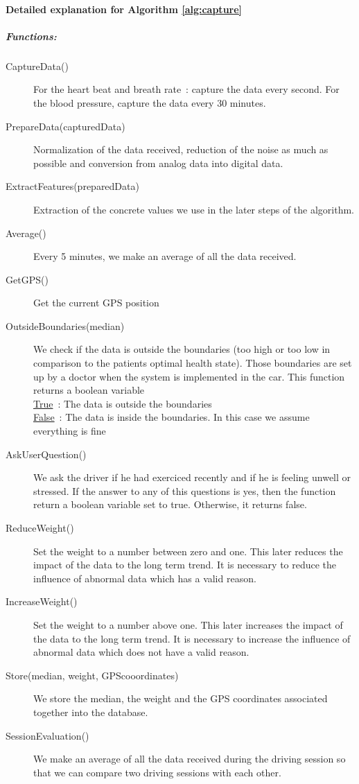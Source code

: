 \paragraph{Detailed explanation for Algorithm \ref{alg:capture}}
\subparagraph{Functions:}
\begin{description}
	\item [CaptureData()] For the heart beat and breath rate : capture the data every second. For the blood pressure, capture the data every 30 minutes.
	\item [PrepareData(capturedData)] Normalization of the data received, reduction of the noise as much as possible and conversion from analog data into digital data.
	\item [ExtractFeatures(preparedData)] Extraction of the concrete values we use in the later steps of the algorithm.
	\item [Average()] Every 5 minutes, we make an average of all the data received.
	\item [GetGPS()] Get the current GPS position
	\item [OutsideBoundaries(median)] We check if the data is outside the boundaries (too high or too low in comparison to the patients optimal health state). Those boundaries are set up by a doctor when the system is implemented in the car. This function returns a boolean variable\\
	\underline{True} : The data is outside the boundaries\\
	\underline{False} : The data is inside the boundaries. In this case we assume everything is fine
	\item [AskUserQuestion()] We ask the driver if he had exerciced recently and if he is feeling unwell or stressed. If the answer to any of this questions is yes, then the function return a boolean variable set to true. Otherwise, it returns false.
	\item [ReduceWeight()] Set the weight to a number between zero and one. This later reduces the impact of the data to the long term trend. It is necessary to reduce the influence of abnormal data which has a valid reason.
	\item [IncreaseWeight()] Set the weight to a number above one. This later increases the impact of the data to the long term trend. It is necessary to increase the influence of abnormal data which does not have a valid reason.
\item [Store(median, weight, GPScooordinates)] We store the median, the weight and the GPS coordinates associated together into the database.
\item [SessionEvaluation()] We make an average of all the data received during the driving session so that we can compare two driving sessions with each other.
\end{description}

